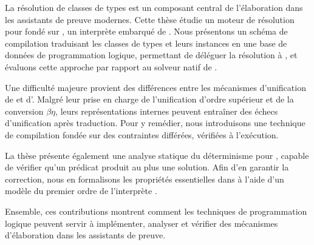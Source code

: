 
\begin{ResumeMotsCles}
\begin{resume}
La résolution de classes de types est un composant central de l'élaboration dans
les assistants de preuve modernes. Cette thèse étudie un moteur de résolution
pour \rocq fondé sur \elpi, un interprète embarqué de \lprolog. Nous
présentons un schéma de compilation traduisant les classes de types et leurs
instances en une base de données de programmation logique, permettant de
déléguer la résolution à \elpi, et évaluons cette approche par rapport au
solveur natif de \rocq.

Une difficulté majeure provient des différences entre les mécanismes
d'unification de \rocq et d'\elpi. Malgré leur prise en charge de l'unification
d'ordre supérieur et de la conversion $\beta\eta$, leurs représentations
internes peuvent entraîner des échecs d'unification après traduction. Pour y
remédier, nous introduisons une technique de compilation fondée sur des
contraintes différées, vérifiées à l'exécution.

La thèse présente également une analyse statique du déterminisme pour \elpi,
capable de vérifier qu'un prédicat produit au plus une solution. Afin d'en
garantir la correction, nous en formalisons les propriétés essentielles dans
\rocq à l'aide d'un modèle du premier ordre de l'interprète \elpi.

Ensemble, ces contributions montrent comment les techniques de programmation
logique peuvent servir à implémenter, analyser et vérifier des mécanismes
d'élaboration dans les assistants de preuve.
\end{resume}

\begin{abstract}

Type-class resolution is a central component of elaboration in modern proof
assistants. This thesis investigates a type-class resolution engine for the \rocq
proof assistant based on \elpi, an embeddable \lprolog interpreter. We
present a compilation scheme translating \rocq type classes and instances into a
logic-programming database, enabling resolution to be delegated to \elpi, and
evaluate its expressiveness and performance against \rocq's native solver.

A key challenge arises from differences between \rocq and \elpi unification.
Although both support higher-order unification and $\beta\eta$-conversion,
differences in term representations can lead to unification failures after
translation. To address this issue, we introduce a compilation technique based
on delayed constraints, replacing problematic subterms with links that record
constraints checked during execution.


\end{abstract}
\end{ResumeMotsCles}
